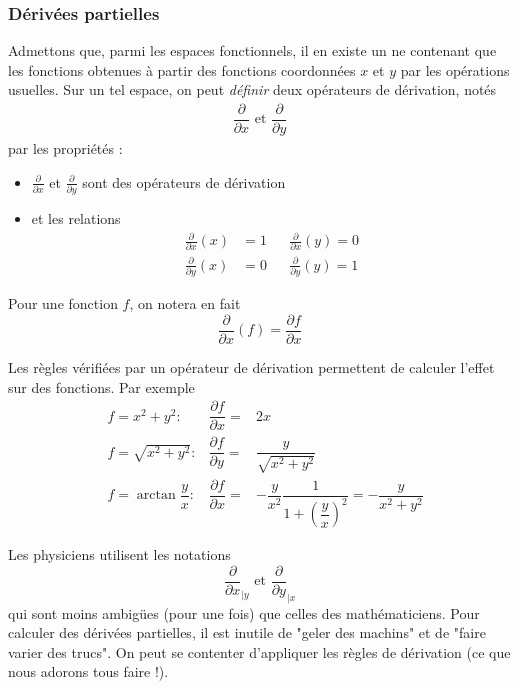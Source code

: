 \subsubsection{Dérivées partielles}
Admettons que, parmi les espaces fonctionnels, il en existe un ne contenant que les fonctions obtenues à partir des fonctions coordonnées $x$ et $y$ par les opérations usuelles. Sur un tel espace, on peut \emph{définir} deux opérateurs de dérivation, notés
\begin{align*}
 \dfrac{\partial}{\partial x} \text{ et } \dfrac{\partial}{\partial y}
\end{align*}
par les propriétés :
\begin{itemize}
 \item $\frac{\partial}{\partial x}$ et  $\frac{\partial}{\partial y}$ sont des opérateurs de dérivation
\item et les relations
\begin{align*}
 \frac{\partial}{\partial x}(x) &= 1 & & \frac{\partial}{\partial x}(y)=0 \\
 \frac{\partial}{\partial y}(x) &= 0 & & \frac{\partial}{\partial y}(y)=1 
\end{align*}
\end{itemize}
Pour une fonction $f$, on notera en fait
\begin{displaymath}
 \frac{\partial}{\partial x}(f) = \dfrac{\partial f}{\partial x}
\end{displaymath}

Les règles vérifiées par un opérateur de dérivation permettent de calculer l'effet sur des fonctions. Par exemple 
\begin{align*}
 &f= x^2+y^2 :& \dfrac{\partial f}{\partial x} =& 2x \\
 &f= \sqrt{x^2+y^2} :& \dfrac{\partial f}{\partial y} =& \dfrac{y}{\sqrt{x^2+y^2}} \\
 &f=\arctan\dfrac{y}{x} :& \dfrac{\partial f}{\partial x} =& -\dfrac{y}{x^2}\dfrac{1}{1+\left(\dfrac{y}{x} \right)^2 }
=-\dfrac{y}{x^2+y^2}
\end{align*}
\begin{rems}
 Les physiciens utilisent les notations
\begin{displaymath}
\frac{\partial}{\partial x}_{\vert y} \text{ et } \frac{\partial}{\partial y}_{\vert x} 
\end{displaymath}
qui sont moins ambigües (pour une fois) que celles des mathématiciens. \newline
Pour calculer des dérivées partielles, il est inutile de "geler des machins" et de "faire varier des trucs". On peut se contenter d'appliquer les règles de dérivation (ce que nous adorons tous faire !).
\end{rems}

